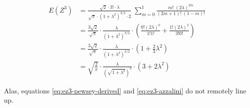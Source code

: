 \documentclass{article}
\begin{document}
\begin{align}
  E(Z^3) &= \frac{\sqrt{2} \cdot 3! \cdot \lambda}{\sqrt{\pi} \cdot (1 + \lambda^2)^{3/2} \cdot 2} \; \sum_{m=0}^1 \frac{m!\;(2\lambda)^{2m}}{(2m + 1)!\;(1 - m)!} \nonumber \\
  &= \frac{3\sqrt{2}}{\sqrt{\pi}} \cdot \frac{\lambda}{(1 + \lambda^2)^{3/2}} \cdot \left( \frac{0! (2\lambda)^0}{1!1!} + \frac{1! (2\lambda)^2}{3!0!} \right) \nonumber \\
  &= \frac{3\sqrt{2}}{\sqrt{\pi}} \cdot \frac{\lambda}{(1 + \lambda^2)^{3/2}} \cdot \left( 1 + \frac{2}{3}\lambda^2 \right) \nonumber \\
  &= \sqrt{\frac{2}{\pi}} \cdot \frac{\lambda}{(\sqrt{1 + \lambda^2})^3} \cdot (3 + 2 \lambda^2) \label{eq:ez3-azzalini}
\end{align}

Alas, equations \eqref{eq:ez3-pewsey-derived} and \eqref{eq:ez3-azzalini} do
not remotely line up.
\end{document}
